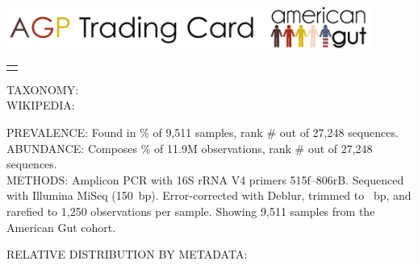 \documentclass[9pt]{amsart}
\begin{document}

\begin{myboxA}

\begin{center}
\includegraphics[width=12cm]{../agp_header.pdf}
\end{center}

\hspace{1.07cm}
\begin{tabular}{L{5in}}
\texttt{\sequence{}}
\end{tabular}

\noindent
\begin{minipage}[t]{.48\textwidth}
\raggedright
\begin{hangparas}{1em}{1}
    TAXONOMY:   \taxonomyGG{}
\\ \vspace{2mm}
    WIKIPEDIA:  \wikipedia{}
\end{hangparas}
\end{minipage}%
\hfill
\begin{minipage}[t]{.48\textwidth}
\raggedright
\begin{hangparas}{1em}{1}
    PREVALENCE: Found in \prevalencePercent{}\% of 9,511 samples, %
                rank \#\prevalenceRank{} out of 27,248 sequences. %
\\ \vspace{2mm}
    ABUNDANCE:  Composes \abundancePercent{}\% of 11.9M observations,
                rank \#\abundanceRank{} out of 27,248 sequences. %
\\ \vspace{2mm}
    METHODS:    Amplicon PCR with 16S rRNA V4 primers 515f--806rB.
    			Sequenced with Illumina MiSeq (150~bp).
                Error-corrected with Deblur, trimmed to \trimLength{}~bp, and
                rarefied to 1,250 observations per sample. %
                Showing 9,511 samples from the American Gut cohort. %
\end{hangparas}
\end{minipage}

RELATIVE DISTRIBUTION BY METADATA:


\end{myboxA}
\end{document}
